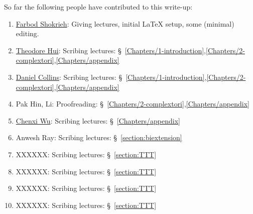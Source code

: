 



\vspace{+.5cm}

So far the following people have contributed to this write-up:
\begin{enumerate}
\item \href{http://www.math.cornell.edu/~farbod}{Farbod Shokrieh}: Giving lectures, initial LaTeX setup, some (minimal) editing.
\item \href{http://www.math.cornell.edu/m/People/bynetid/hh535}{Theodore Hui}: Scribing lectures: \S~\ref{Chapters/1-introduction},\ref{Chapters/2-complextori},\ref{Chapters/appendix}
\item \href{https://www.math.cornell.edu/m/People/bynetid/djc224}{Daniel Collins}: Scribing lectures: \S~\ref{Chapters/1-introduction},\ref{Chapters/2-complextori},\ref{Chapters/appendix}
\item Pak Hin, Li: Proofreading: \S~\ref{Chapters/2-complextori},\ref{Chapters/appendix}
\item \href{http://www.math.cornell.edu/~wuchenxi/}{Chenxi Wu}: Scribing lectures: \S~\ref{Chapters/appendix}
\item Anwesh Ray: Scribing lectures: \S~\ref{section:biextension}
\item XXXXXX: Scribing lectures: \S~\ref{section:TTT}
\item XXXXXX: Scribing lectures: \S~\ref{section:TTT}
\item XXXXXX: Scribing lectures: \S~\ref{section:TTT}
\item XXXXXX: Scribing lectures: \S~\ref{section:TTT}
\end{enumerate}


